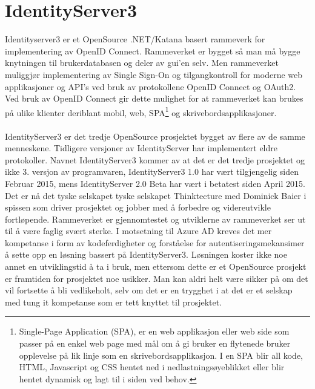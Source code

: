 \section{IdentityServer3}
\label{sec:teoridel_identityServer3}
Identityserver3 er et OpenSource .NET/Katana basert rammeverk for implementering av OpenID Connect. Rammeverket er bygget så man må bygge knytningen til brukerdatabasen og deler av gui'en selv. Men rammeverket muliggjør implementering av Single Sign-On og tilgangkontroll for moderne web applikasjoner og API's ved bruk av protokollene OpenID Connect og OAuth2. Ved bruk av OpenID Connect gir dette mulighet for at rammeverket kan brukes på ulike klienter deriblant mobil, web, SPA\footnote{Single-Page Application (SPA), er en web applikasjon eller web side som passer på en enkel web page med mål om å gi bruker en flytenede bruker opplevelse på lik linje som en skrivebordsapplikasjon. I en SPA blir all kode, HTML, Javascript og CSS hentet ned i nedlastningsøyeblikket eller blir hentet dynamisk og lagt til i siden ved behov.} og skrivebordsapplikasjoner. 
\\
\\
IdentityServer3 er det tredje OpenSource prosjektet bygget av flere av de samme menneskene. Tidligere versjoner av IdentityServer har implementert eldre protokoller. Navnet IdentityServer3 kommer av at det er det tredje prosjektet og ikke 3. versjon av programvaren, IdentityServer3 1.0 har vært tilgjengelig siden Februar 2015, mens IdentityServer 2.0 Beta har vært i betatest siden April 2015. Det er nå det tyske selskapet tyske selskapet Thinktecture med Dominick Baier i spissen som driver prosjektet og jobber med å forbedre og videreutvikle fortløpende\cite{IDServV3Hist}. Rammeverket er gjennomtestet og utviklerne av rammeverket ser ut til å være faglig svært sterke. I motsetning til Azure AD kreves det mer kompetanse i form av kodeferdigheter og forståelse for autentiseringsmekansimer å sette opp en løsning bassert på IdentityServer3. Løsningen koster ikke noe annet en utviklingstid å ta i bruk, men ettersom dette er et OpenSource prosjekt er framtiden for prosjektet noe usikker. Man kan aldri helt være sikker på om det vil fortsette å bli vedlikeholt, selv om det er en trygghet i at det er et selskap med tung it kompetanse som er tett knyttet til prosjektet.   

